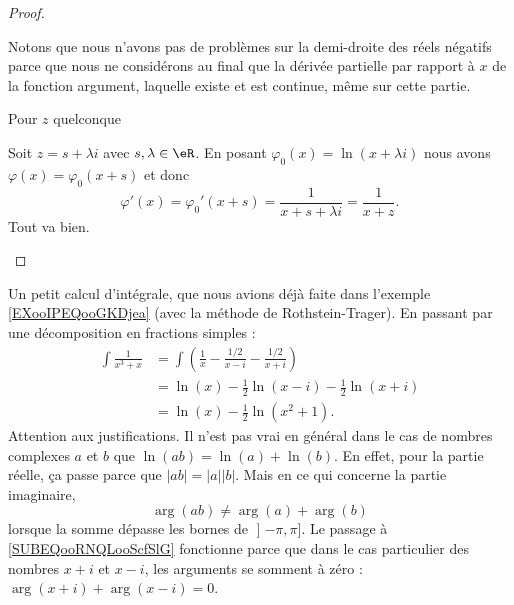 \begin{proof}
\begin{subproof}
    Notons que nous n'avons pas de problèmes sur la demi-droite des réels négatifs parce que nous ne considérons au final que la dérivée partielle par rapport à \( x\) de la fonction argument, laquelle existe et est continue, même sur cette partie.

        \item[Pour \( z\) quelconque]

            Soit \( z=s+\lambda i\) avec \( s,\lambda\in \eR\). En posant \( \varphi_0(x)=\ln(x+\lambda i)\) nous avons \( \varphi(x)=\varphi_0(x+s)\) et donc 
            \begin{equation}
                \varphi'(x)=\varphi_0'(x+s)=\frac{ 1 }{ x+s+\lambda i }=\frac{1}{ x+z }.
            \end{equation}
            Tout va bien.

    \end{subproof}
\end{proof}

\begin{example}     \label{EXooAKEDooZgjocX}
    Un petit calcul d'intégrale, que nous avions déjà faite dans l'exemple \ref{EXooIPEQooGKDjea} (avec la méthode de Rothstein-Trager). En passant par une décomposition en fractions simples :
    \begin{subequations}
        \begin{align}
            \int\frac{1}{ x^3+x }&=\int\left( \frac{1}{ x }-\frac{ 1/2 }{ x-i }-\frac{ 1/2 }{ x+i } \right)\\
            &=\ln(x)-\frac{ 1 }{2}\ln(x-i)-\frac{ 1 }{2}\ln(x+i)\\
            &=\ln(x)-\frac{ 1 }{2}\ln(x^2+1).       \label{SUBEQooRNQLooScfSlG}
        \end{align}
    \end{subequations}
    Attention aux justifications. Il n'est pas vrai en général dans le cas de nombres complexes \( a\) et \( b\) que \( \ln(ab)=\ln(a)+\ln(b)\). En effet, pour la partie réelle, ça passe parce que \( | ab |=| a | |b |\). Mais en ce qui concerne la partie imaginaire, 
    \begin{equation}
        \arg(ab)\neq \arg(a)+\arg(b)
    \end{equation}
lorsque la somme dépasse les bornes de \( \mathopen] -\pi , \pi \mathclose]\). Le passage à \eqref{SUBEQooRNQLooScfSlG} fonctionne parce que dans le cas particulier des nombres \( x+i\) et \( x-i\), les arguments se somment à zéro : \( \arg(x+i)+\arg(x-i)=0\).
\end{example}

